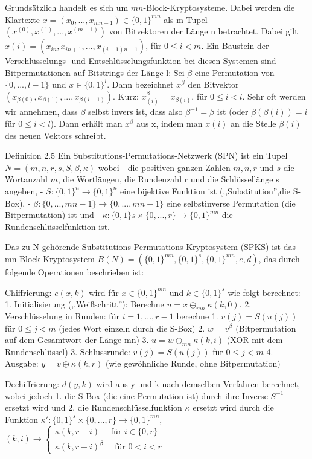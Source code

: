 \documentclass[a4paper]{article}
\begin{document}
\begin{multicols}{3}
    Grundsätzlich handelt es sich um $mn$-Block-Kryptosysteme. Dabei werden die Klartexte $x=(x_0,...,x_{mn-1})\in\{ 0,1\}^{mn}$ als m-Tupel $(x^{(0)},x^{(1)},...,x^{(m-1)})$ von Bitvektoren der Länge n betrachtet. Dabei gilt $x(i)=(x_{in},x_{in+1},...,x_{(i+1)n-1})$, für $0\leq i<m$.
    Ein Baustein der Verschlüsselungs- und Entschlüsselungsfunktion bei diesen Systemen sind Bitpermutationen  auf Bitstrings der Länge l: Sei $\beta$ eine Permutation von $\{0,...,l-1\}$ und $x\in\{0,1\}^l$. Dann bezeichnet $x^{\beta}$ den Bitvektor $(x_{{\beta}(0)},x_{{\beta}(1)},...,x_{{\beta}(l-1)})$. Kurz: $x^{\beta}_{(i)}=x_{{\beta}(i)}$, für $0\leq i<l$.
    Sehr oft werden wir annehmen, dass $\beta$ selbst invers ist, dass also ${\beta}^{-1}=\beta$ ist (oder ${\beta}({\beta}(i))=i$ für $0\leq i<l$). Dann erhält man $x^{\beta}$ aus x, indem man $x(i)$ an die Stelle ${\beta}(i)$ des neuen Vektors schreibt.

    Definition 2.5 Ein Substitutions-Permutations-Netzwerk (SPN) ist ein Tupel $N=(m,n,r,s,S,\beta,\kappa)$ wobei
    - die positiven ganzen Zahlen $m,n,r$ und $s$ die Wortanzahl $m$, die Wortlängen, die Rundenzahl r und die Schlüssellänge s angeben,
    - $S:\{0,1\}^n\rightarrow\{0,1\}^n$ eine bijektive Funktion ist (,,Substitution'',die S-Box),
    - ${\beta}:\{0,...,mn-1\}\rightarrow\{0,...,mn-1\}$ eine selbstinverse Permutation (die Bitpermutation) ist und
    - $\kappa :\{0,1\}s\times\{0,...,r\}\rightarrow\{0,1\}^{mn}$ die Rundenschlüsselfunktion ist.

    Das zu N gehörende Substitutions-Permutations-Kryptosystem (SPKS) ist das mn-Block-Kryptosystem $B(N)=(\{0,1\}^{mn},\{0,1\}^s,\{0,1\}^{mn},e,d)$, das durch folgende Operationen beschrieben ist:

    Chiffrierung: $e(x,k)$ wird für $x\in\{0,1\}^{mn}$ und $k\in\{0,1\}^s$ wie folgt berechnet:
    1. Initialisierung (,,Weißschritt''): Berechne $u=x\oplus_{mn} \kappa (k,0)$.
    2. Verschlüsselung in Runden: für $i=1,...,r-1$ berechne
    1. $v(j)=S(u(j))$ für $0\leq j<m$ (jedes Wort einzeln durch die S-Box)
    2. $w=v^{\beta}$ (Bitpermutation auf dem Gesamtwort der Länge mn)
    3. $u=w\oplus_{mn} \kappa (k,i)$ (XOR mit dem Rundenschlüssel)
    3. Schlussrunde: $v(j)=S(u(j))$ für $0\leq j<m$
    4. Ausgabe: $y=v\oplus \kappa (k,r)$ (wie gewöhnliche Runde, ohne Bitpermutation)

    Dechiffrierung: $d(y,k)$ wird aus y und k nach demselben Verfahren berechnet, wobei jedoch
    1. die S-Box (die eine Permutation ist) durch ihre Inverse $S^{-1}$ ersetzt wird und
    2. die Rundenschlüsselfunktion $\kappa$ ersetzt wird durch die Funktion $\kappa':\{0,1\}^s\times\{0,...,r\}\rightarrow\{0,1\}^{mn}$, $(k,i)\rightarrow\begin{cases} \kappa (k,r-i)\quad\text{ für } i\in\{0,r\}\\ \kappa(k,r-i)^{\beta} \quad\text{ für } 0<i<r \end{cases}$


\end{multicols}
\end{document}
